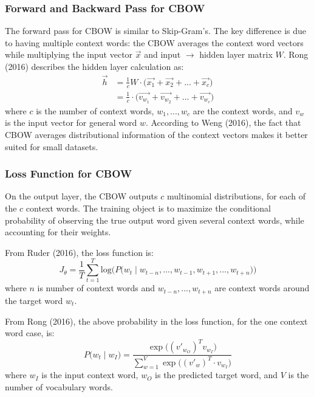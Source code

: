 \subsubsection{Forward and Backward Pass for CBOW}

The forward pass for CBOW is similar to Skip-Gram's. The key difference is due to having multiple context words: the CBOW averages the context word vectors while multiplying the input vector $\overrightarrow{x}$ and input $\rightarrow$ hidden layer matrix $W$. Rong (2016) describes the hidden layer calculation as: 
$$
\begin{array}{ll}
\overrightarrow{h} 
&= \frac{1}{c} W \cdot \Big(\overrightarrow{x_1} + \overrightarrow{x_2} + ... + \overrightarrow{x_c} \Big) \\
&= \frac{1}{c} \cdot \Big(\overrightarrow{v_{w_1}} + \overrightarrow{v_{w_2}} + ... + \overrightarrow{v_{w_c}} \Big)
\end{array}
$$
where $c$ is the number of context words, $w_1,...,w_c$ are the context words, and $v_w$ is the input vector for general word $w$. According to Weng (2016), the fact that CBOW averages distributional information of the context vectors makes it better suited for small datasets. 

\subsubsection{Loss Function for CBOW}

On the output layer, the CBOW outputs $c$ multinomial distributions, for each of the $c$ context words. The training object is to maximize the conditional probability of observing the true output word given several context words, while accounting for their weights. 

From Ruder (2016), the loss function is: 
$$
J_\theta = \frac{1}{T} \sum_{t=1}^T \text{log} \Big( P \Big( w_t \; | \; w_{t-n}, ..., w_{t-1}, w_{t+1}, ..., w_{t+n} \Big) \Big)
$$
where $n$ is number of context words and $w_{t-n}, ..., w_{t+n}$ are context words around the target word $w_t$. 

From Rong (2016), the above probability in the loss function, for the one context word case, is:
$$
P \Big( w_t \; | \; w_I \Big) = \frac {\exp{ \Big( (v'_{w_O})^T  v_{w_I} \Big) }} {\sum_{w=1}^V \exp{ \Big( (v'_w)^T \cdot v_{w_I} \Big) }}
$$
where $w_I$ is the input context word, $w_O$ is the predicted target word, and $V$ is the number of vocabulary words. 
\newline 

